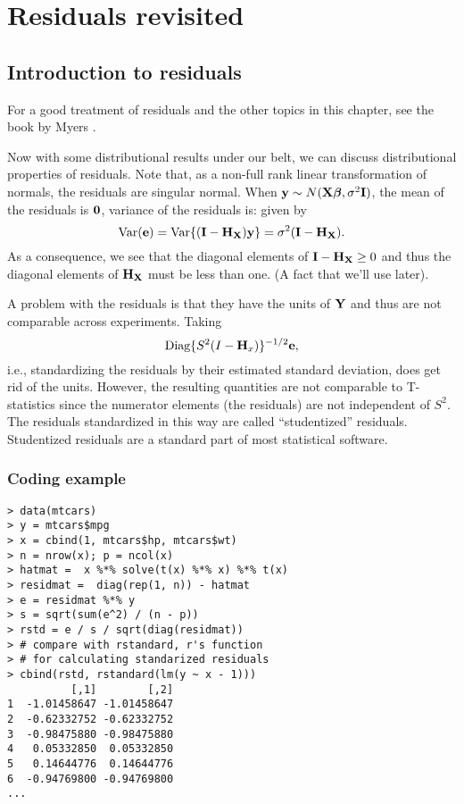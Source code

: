 \chapter{Residuals revisited}

\section{Introduction to residuals}
For a good treatment of residuals and the other topics in this chapter, 
see the book by Myers \citep{myers1990classical}.

Now with some distributional results under our belt, we can discuss distributional
properties of residuals. Note that, as a non-full rank linear transformation of
normals, the residuals are singular normal. When $\mathbf{y} \sim N(\mathbf{X} \boldsymbol{\beta}, \sigma^2 \mathbf{I})$, the mean of the residuals is $\mathbf{0}$, variance of the residuals is:
given by
$$
\mbox{Var}(\mathbf{e}) = \mbox{Var}\{(\mathbf{I} - \mathbf{H}_{\mathbf{X}})\mathbf{y}\} = \sigma^2 (\mathbf{I} - \mathbf{H}_{\mathbf{X}}).
$$
As a consequence, we see that the diagonal elements of $\mathbf{I} - \mathbf{H}_{\mathbf{X}} \geq 0$
and thus the diagonal elements of $\mathbf{H}_{\mathbf{X}}$ must be less than one. (A fact that
we'll use later). 

A problem with the residuals is that they have the units of $\mathbf{Y}$ and thus are
not comparable across experiments. Taking 
$$\mbox{Diag}\{S^2(I - \mathbf{H}_x)\}^{-1/2}\mathbf{e},$$ 
i.e., standardizing the residuals by their estimated standard deviation, does
get rid of the units. However, the resulting quantities are not comparable to
T-statistics since the numerator elements (the residuals) are not independent of $S^2$.
The residuals standardized in this way are called ``studentized'' residuals. 
Studentized residuals are a standard part of most statistical software.

\subsection{Coding example}
\begin{verbatim}
> data(mtcars)
> y = mtcars$mpg
> x = cbind(1, mtcars$hp, mtcars$wt)
> n = nrow(x); p = ncol(x)
> hatmat =  x %*% solve(t(x) %*% x) %*% t(x)
> residmat =  diag(rep(1, n)) - hatmat
> e = residmat %*% y
> s = sqrt(sum(e^2) / (n - p))
> rstd = e / s / sqrt(diag(residmat))
> # compare with rstandard, r's function
> # for calculating standarized residuals
> cbind(rstd, rstandard(lm(y ~ x - 1)))
          [,1]        [,2]
1  -1.01458647 -1.01458647
2  -0.62332752 -0.62332752
3  -0.98475880 -0.98475880
4   0.05332850  0.05332850
5   0.14644776  0.14644776
6  -0.94769800 -0.94769800
...
\end{verbatim}

